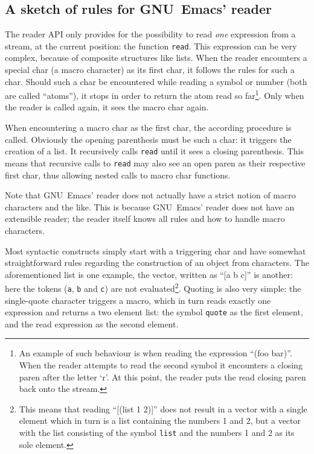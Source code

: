 \documentclass[a4paper,10pt,twoside]{report}
\newcommand{\sym}[1]{\texttt{#1}}
\newcommand{\fun}[1]{\texttt{#1}}
\newcommand{\emacs}{GNU~Emacs}
\newcommand{\Read}{\fun{read}}
\begin{document}
\subsection{A sketch of rules for \emacs’ reader}
\label{subsubsec:rules-sketch}

The reader API only provides for the possibility to read \emph{one} expression
from a stream, at the current position: the function \Read{}.  This
expression can be very complex, because of composite structures like lists.
When the reader encounters a special char (a macro character) as its first char,
it follows the rules for such a char.  Should such a char be encountered while
reading a symbol or number (both are called ``atoms''), it stops in order to
return the atom read so far\footnote{An example of such behaviour is when
  reading the expression ``(foo bar)''.  When the reader attempts to read the
  second symbol it encounters a closing paren after the letter `r'.  At this
  point, the reader puts the read closing paren back onto the stream.}.  Only
when the reader is called again, it sees the macro char again.

When encountering a macro char as the first char, the according procedure is
called.  Obviously the opening parenthesis must be such a char: it triggers the
creation of a list.  It recursively calls \Read{} until it sees a closing
parenthesis.  This means that recursive calls to \Read{} may also see an open
paren as their respective first char, thus allowing nested calls to macro char
functions.

Note that \emacs{}’ reader does not actually have a strict notion of macro
characters and the like.  This is because \emacs{}’ reader does not have an
extensible reader; the reader itself knows all rules and how to handle macro
characters.

Most syntactic constructs simply start with a triggering char and have somewhat
straightforward rules regarding the construction of an object from characters.
The aforementioned list is one example, the vector, written as ``[a b c]'' is
another: here the tokens (\sym{a}, \sym{b} and \sym{c}) are not
evaluated\footnote{This means that reading ``[(list 1 2)]'' does not result in a
  vector with a single element which in turn is a list containing the numbers 1
  and 2, but a vector with the list consisting of the symbol \sym{list} and the
  numbers 1 and 2 as its sole element.}.  Quoting is also very simple: the
single-quote character triggers a macro, which in turn reads exactly one
expression and returns a two element list: the symbol \sym{quote} as the first
element, and the read expression as the second element.
\end{document}
